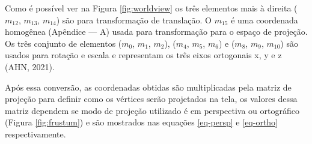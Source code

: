 Como é possível ver na Figura \ref{fig:worldview} os três elementos mais à direita ($ m_{12} $, $ m_{13} $, $ m_{14} $) são para transformação de translação. O $ m_{15} $ é uma coordenada homogênea (Apêndice --- A) usada para transformação para o espaço de projeção. Os três conjunto de elementos ($ m_{0} $, $ m_{1} $, $ m_{2} $), ($ m_{4} $, $ m_{5} $, $ m_{6} $) e ($ m_{8} $, $ m_{9} $, $ m_{10} $) são usados para rotação e escala e representam os três eixos ortogonais x, y e z (AHN, 2021)\nocite{openglOnline}.

\begin{figure}[h!]
	\centering
\end{figure}

Após essa conversão, as coordenadas obtidas são multiplicadas pela matriz de projeção para definir como os vértices serão projetados na tela, os valores dessa matriz dependem se modo de projeção utilizado é em perspectiva ou ortográfico (Figura \ref{fig:frustum}) e são mostrados nas equações \ref{eq-persp} e \ref{eq-ortho} respectivamente. 

